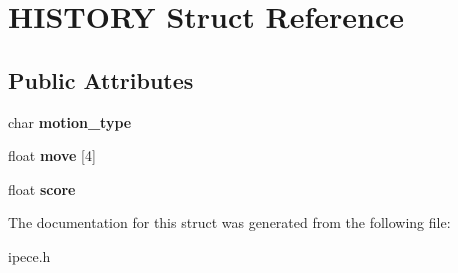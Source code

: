 \hypertarget{struct_h_i_s_t_o_r_y}{\section{H\-I\-S\-T\-O\-R\-Y Struct Reference}
\label{struct_h_i_s_t_o_r_y}
}
\subsection*{Public Attributes}
\begin{DoxyCompactItemize}
\item 
\hypertarget{struct_h_i_s_t_o_r_y_a5b51cce35ef322045c769c76a953cac2}{char {\bfseries motion\-\_\-type}}\label{struct_h_i_s_t_o_r_y_a5b51cce35ef322045c769c76a953cac2}

\item 
\hypertarget{struct_h_i_s_t_o_r_y_ab3e155f8d1a981e5bef6a0e550e604e2}{float {\bfseries move} \mbox{[}4\mbox{]}}\label{struct_h_i_s_t_o_r_y_ab3e155f8d1a981e5bef6a0e550e604e2}

\item 
\hypertarget{struct_h_i_s_t_o_r_y_aaf683ad597dc71330bc4aaaf66e095e2}{float {\bfseries score}}\label{struct_h_i_s_t_o_r_y_aaf683ad597dc71330bc4aaaf66e095e2}

\end{DoxyCompactItemize}


The documentation for this struct was generated from the following file\-:\begin{DoxyCompactItemize}
\item 
ipece.\-h\end{DoxyCompactItemize}
